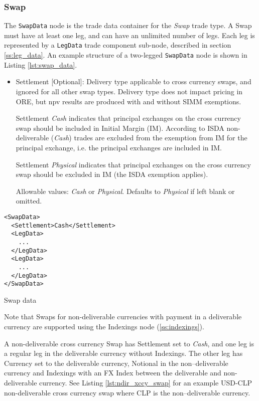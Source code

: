 \subsubsection{Swap}

The \lstinline!SwapData! node is the trade data container for the \emph{Swap} trade type. A Swap must have at least one leg,
and can have an unlimited number of legs. Each leg is represented by a \lstinline!LegData! trade component sub-node,
described in section \ref{ss:leg_data}. An example structure of a two-legged \lstinline!SwapData!
node is shown in Listing \ref{lst:swap_data}.
\begin{itemize}
\item Settlement [Optional]: Delivery type applicable to cross currency swaps, and ignored for all other swap types. Delivery type does not impact pricing in ORE, but npv results are produced with and without SIMM exemptions.  

Settlement \emph{Cash} indicates that principal exchanges on the cross currency swap should be included in Initial Margin (IM). According to ISDA non-deliverable (\emph{Cash}) trades are excluded from the exemption from IM for the principal exchange, i.e. the principal exchanges are included in IM. 

Settlement \emph{Physical} indicates that principal exchanges on the cross currency swap should be excluded in IM (the ISDA exemption applies).  

Allowable values: \emph{Cash} or \emph{Physical}.  Defaults to \emph{Physical} if left blank or omitted.
\end{itemize}

\begin{listing}[H]
\begin{verbatim}
<SwapData>
  <Settlement>Cash</Settlement>
  <LegData>
    ...
  </LegData>
  <LegData>
    ...
  </LegData>
</SwapData>
\end{verbatim}
\caption{Swap data}
\label{lst:swap_data}
\end{listing}


Note that Swaps for non-deliverable currencies with payment in a deliverable currency are supported using the Indexings node (\ref{ss:indexings}). 

A non-deliverable cross currency Swap has Settlement set to \emph{Cash}, and one leg is a regular leg in the deliverable currency without Indexings. The other leg has Currency set to the deliverable currency, Notional in the non–deliverable currency and Indexings with an FX Index between the deliverable and non-deliverable currency. See Listing \ref{lst:ndir_xccy_swap} for an example USD-CLP non-deliverable cross currency swap where CLP is the non–deliverable currency.

